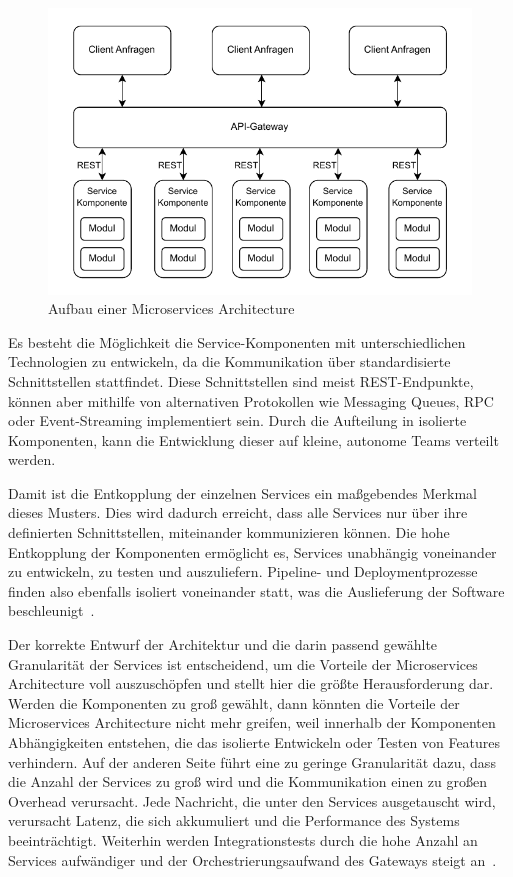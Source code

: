 \documentclass[acmtog]{acmart}
\begin{document}
\begin{figure}[!h]
  \centering
  \includegraphics[width=\linewidth]{images/microservices/microservices}
  \caption{Aufbau einer Microservices Architecture}
  \label{fig:microservices}
\end{figure}

Es besteht die Möglichkeit die Service-Komponenten mit unterschiedlichen Technologien zu entwickeln, da die Kommunikation über standardisierte Schnittstellen stattfindet.
Diese Schnittstellen sind meist REST-Endpunkte, können aber mithilfe von alternativen Protokollen wie Messaging Queues, RPC oder Event-Streaming implementiert sein.
Durch die Aufteilung in isolierte Komponenten, kann die Entwicklung dieser auf kleine, autonome Teams verteilt werden.

Damit ist die Entkopplung der einzelnen Services ein maßgebendes Merkmal dieses Musters.
Dies wird dadurch erreicht, dass alle Services nur über ihre definierten Schnittstellen, miteinander kommunizieren können.
Die hohe Entkopplung der Komponenten ermöglicht es, Services unabhängig voneinander zu entwickeln, zu testen und auszuliefern.
Pipeline- und Deploymentprozesse finden also ebenfalls isoliert voneinander statt, was die Auslieferung der Software beschleunigt~\cite[27]{architecturePatterns}.

Der korrekte Entwurf der Architektur und die darin passend gewählte Granularität der Services ist entscheidend, um die Vorteile der Microservices Architecture voll auszuschöpfen und stellt hier die größte Herausforderung dar.
Werden die Komponenten zu groß gewählt, dann könnten die Vorteile der Microservices Architecture nicht mehr greifen, weil innerhalb der Komponenten Abhängigkeiten entstehen, die das isolierte Entwickeln oder Testen von Features verhindern.
Auf der anderen Seite führt eine zu geringe Granularität dazu, dass die Anzahl der Services zu groß wird und die Kommunikation einen zu großen Overhead verursacht.
Jede Nachricht, die unter den Services ausgetauscht wird, verursacht Latenz, die sich akkumuliert und die Performance des Systems beeinträchtigt.
Weiterhin werden Integrationstests durch die hohe Anzahl an Services aufwändiger und der Orchestrierungsaufwand des Gateways steigt an~\cite[32]{architecturePatterns}.
\end{document}
